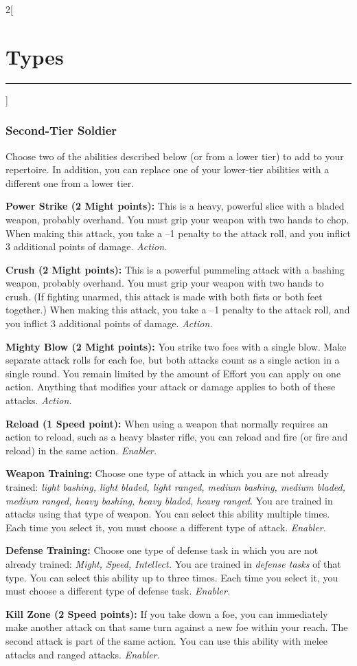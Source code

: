 \documentclass[a4paper,10pt,final]{book}
\newcommand{\HRule}{\rule{\linewidth}{0.5mm}} %
\newcommand{\newSection}[1]{\section*{#1} \addcontentsline{toc}{section}{#1} \label{sec:#1} \HRule}
\newcommand{\itemAbility}[2]{\textcolor{25gray}{\textbullet\textbf{ #1:}} {#2}\par}
\newcommand{\enabler}{\textit{ Enabler.}}
\newcommand{\action}{\textit{ Action.}}
\newenvironment{docsection}[1]
{
  \begin{multicols*}{2}[\newSection{#1}]
}
{
  \end{multicols*}
  \newpage
}
\begin{document}
\begin{docsection}{Types}
\subsubsection*{Second-Tier Soldier}
\label{subsub:soldierSecondTier}
Choose two of the abilities described below (or from a lower tier) to add to your repertoire. In addition, you can replace one of your lower-tier abilities with a different one from a lower tier.\par
\itemAbility{Power Strike (2 Might points)}{This is a heavy,
powerful slice with a bladed weapon,
probably overhand. You must grip your
weapon with two hands to chop. When
making this attack, you take a –1 penalty to
the attack roll, and you inflict 3 additional
points of damage.\action}
\itemAbility{Crush (2 Might points)}{This is a powerful
pummeling attack with a bashing weapon,
probably overhand. You must grip your
weapon with two hands to crush. (If fighting
unarmed, this attack is made with both fists
or both feet together.) When making this
attack, you take a –1 penalty to the attack
roll, and you inflict 3 additional points of
damage.\action}
\itemAbility{Mighty Blow (2 Might points)}{You strike
two foes with a single blow. Make separate
attack rolls for each foe, but both attacks
count as a single action in a single round.
You remain limited by the amount of Effort
you can apply on one action. Anything that
modifies your attack or damage applies to
both of these attacks.\action}
\itemAbility{Reload (1 Speed point)}{When using a
weapon that normally requires an action to
reload, such as a heavy blaster rifle, you can
reload and fire (or fire and reload) in the
same action.\enabler}
\itemAbility{Weapon Training}{Choose one type of
attack in which you are not already trained:
\textit{light bashing, light bladed, light ranged,
medium bashing, medium bladed, medium
ranged, heavy bashing, heavy bladed, 
heavy ranged}. You are trained in attacks
using that type of weapon. You can select
this ability multiple times. Each time you
select it, you must choose a different type of
attack.\enabler}
\itemAbility{Defense Training}{Choose one type of
defense task in which you are not already
trained: \textit{Might, Speed, Intellect.} You are
trained in \emph{defense tasks} of that type. You
can select this ability up to three times.
Each time you select it, you must choose a
different type of defense task.\enabler}
\itemAbility{Kill Zone (2 Speed points)}{If you
take down a foe, you can immediately make
another attack on that same turn against
a new foe within your reach. The second
attack is part of the same action. You can
use this ability with melee attacks and
ranged attacks.\enabler}


\end{docsection}
\end{document}
